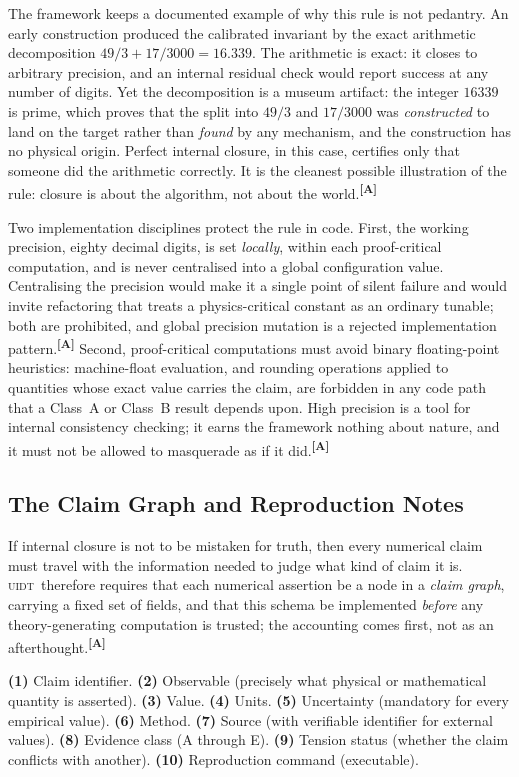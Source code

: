 \documentclass[12pt,a4paper,twoside]{article}
\theoremstyle{plain}
\theoremstyle{definition}
\theoremstyle{remark}
\newcommand{\UIDT}{\textsc{uidt}}
\newcommand{\catmark}[1]{\textsuperscript{\textsf{\textbf{[#1]}}}}
\begin{document}
\noindent The framework keeps a documented example of why this rule is not pedantry. An early construction produced the calibrated invariant by the exact arithmetic decomposition $49/3 + 17/3000 = 16.339$. The arithmetic is exact: it closes to arbitrary precision, and an internal residual check would report success at any number of digits. Yet the decomposition is a museum artifact: the integer $16339$ is prime, which proves that the split into $49/3$ and $17/3000$ was \emph{constructed} to land on the target rather than \emph{found} by any mechanism, and the construction has no physical origin. Perfect internal closure, in this case, certifies only that someone did the arithmetic correctly. It is the cleanest possible illustration of the rule: closure is about the algorithm, not about the world.\catmark{A}

Two implementation disciplines protect the rule in code. First, the working precision, eighty decimal digits, is set \emph{locally}, within each proof-critical computation, and is never centralised into a global configuration value. Centralising the precision would make it a single point of silent failure and would invite refactoring that treats a physics-critical constant as an ordinary tunable; both are prohibited, and global precision mutation is a rejected implementation pattern.\catmark{A} Second, proof-critical computations must avoid binary floating-point heuristics: machine-float evaluation, and rounding operations applied to quantities whose exact value carries the claim, are forbidden in any code path that a Class~A or Class~B result depends upon. High precision is a tool for internal consistency checking; it earns the framework nothing about nature, and it must not be allowed to masquerade as if it did.\catmark{A}

\subsection{The Claim Graph and Reproduction Notes}
\label{subsec:claim-graph}

If internal closure is not to be mistaken for truth, then every numerical claim must travel with the information needed to judge what kind of claim it is. \UIDT\ therefore requires that each numerical assertion be a node in a \emph{claim graph}, carrying a fixed set of fields, and that this schema be implemented \emph{before} any theory-generating computation is trusted; the accounting comes first, not as an afterthought.\catmark{A}

\begin{governancebox}
\textbf{(1)} Claim identifier. \quad \textbf{(2)} Observable (precisely what physical or mathematical quantity is asserted). \quad \textbf{(3)} Value. \quad \textbf{(4)} Units. \quad \textbf{(5)} Uncertainty (mandatory for every empirical value). \quad \textbf{(6)} Method. \quad \textbf{(7)} Source (with verifiable identifier for external values). \quad \textbf{(8)} Evidence class (A through E). \quad \textbf{(9)} Tension status (whether the claim conflicts with another). \quad \textbf{(10)} Reproduction command (executable).
\end{governancebox}
\end{document}
